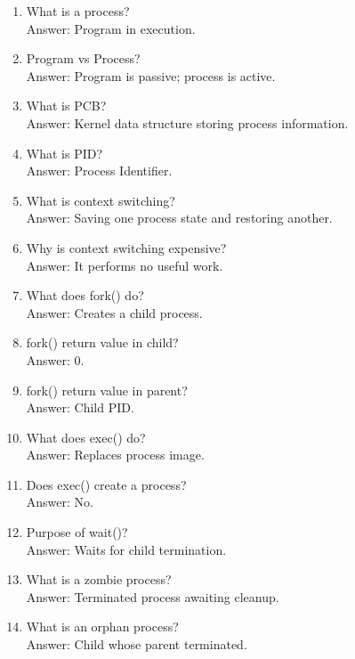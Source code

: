 \begin{enumerate}
\item What is a process?\\
Answer: Program in execution.

\item Program vs Process?\\
Answer: Program is passive; process is active.

\item What is PCB?\\
Answer: Kernel data structure storing process information.

\item What is PID?\\
Answer: Process Identifier.

\item What is context switching?\\
Answer: Saving one process state and restoring another.

\item Why is context switching expensive?\\
Answer: It performs no useful work.

\item What does fork() do?\\
Answer: Creates a child process.

\item fork() return value in child?\\
Answer: 0.

\item fork() return value in parent?\\
Answer: Child PID.

\item What does exec() do?\\
Answer: Replaces process image.

\item Does exec() create a process?\\
Answer: No.

\item Purpose of wait()?\\
Answer: Waits for child termination.

\item What is a zombie process?\\
Answer: Terminated process awaiting cleanup.

\item What is an orphan process?\\
Answer: Child whose parent terminated.


\end{enumerate}
